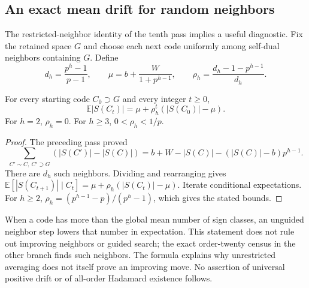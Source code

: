\subsection{An exact mean drift for random neighbors}
The restricted-neighbor identity of the tenth pass implies a useful
diagnostic. Fix the retained space $G$ and choose each next code
uniformly among self-dual neighbors containing $G$. Define
\[
 d_h=\frac{p^h-1}{p-1},\qquad
 \mu=b+\frac{W}{1+p^{h-1}},\qquad
 \rho_h=\frac{d_h-1-p^{h-1}}{d_h}.
\]
\begin{proposition}
For every starting code $C_0\supset G$ and every integer $t\ge0$,
\[
 \mathbb E |S(C_t)|=\mu+\rho_h^t(|S(C_0)|-\mu).
\]
For $h=2$, $\rho_h=0$. For $h\ge3$, $0<\rho_h<1/p$.
\end{proposition}
\begin{proof}
The preceding pass proved
\[
 \sum_{C'\sim C,\ C'\supset G}(|S(C')|-|S(C)|)
 =b+W-|S(C)|-(|S(C)|-b)p^{h-1}.
\]
There are $d_h$ such neighbors. Dividing and rearranging gives
$\mathbb E[|S(C_{t+1})|\mid C_t]
=\mu+\rho_h(|S(C_t)|-\mu)$. Iterate conditional expectations.
For $h\ge2$,
$\rho_h=(p^{h-1}-p)/(p^h-1)$, which gives the stated bounds.
\end{proof}

When a code has more than the global mean number of sign classes,
an unguided neighbor step lowers that number in expectation.
This statement does not rule out improving neighbors or guided
search; the exact order-twenty census in the other branch finds
such neighbors. The formula explains why unrestricted averaging
does not itself prove an improving move. No assertion of universal
positive drift or of all-order Hadamard existence follows.
